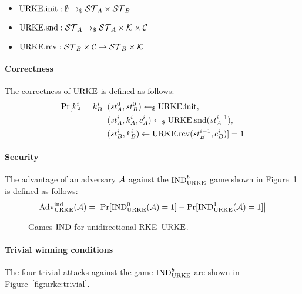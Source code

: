 \begin{itemize}
    \item $\mathrm{URKE}.\mathrm{init}: \emptyset\to_\$\mathcal{ST}_A\times\mathcal{ST}_B$
    \item $\mathrm{URKE}.\mathrm{snd}: \mathcal{ST}_A\to_\$\mathcal{ST}_A\times\mathcal{K}\times\mathcal{C}$
    \item $\mathrm{URKE}.\mathrm{rcv}: \mathcal{ST}_B\times\mathcal{C}\to\mathcal{ST}_B\times\mathcal{K}$
\end{itemize}

\paragraph{Correctness} The correctness of $\mathrm{URKE}$ is defined as follows:
\begin{align*} %
    \Pr[k_A^i=k_B^i\mid &(\st_A^0, \st_B^0)\getsr\URKEinit, \\
                        &(\st_A^i, k_A^i, c_A^i)\getsr\URKEsnd(\st_A^{i-1}), \\
                        &(\st_B^i, k_B^i)\gets\URKErcv(\st_B^{i-1}, c_B^i)] = 1
\end{align*}

\paragraph{Security} The advantage of an adversary $\mathcal{A}$ against the ${\mathrm{IND}}_{\mathrm{URKE}}^b$ game shown in Figure~\ref{fig:urke:ind} is defined as follows:
\[\mathrm{Adv}_{\mathrm{URKE}}^{\mathrm{ind}}(\mathcal{A}) = \left|\Pr[{\mathrm{IND}}_{\mathrm{URKE}}^0(\mathcal{A})=1] - \Pr[{\mathrm{IND}}_{\mathrm{URKE}}^1(\mathcal{A})=1]\right|\]

\begin{figure}[!ht]
    \centering
    \nicoresetlinenr%
    \fbox{%
        \scalebox{\codescalefactor}{%
        }%
    }
    \caption{%
        Games ${\mathrm{IND}}$ for unidirectional RKE~$\mathrm{URKE}$.
    }
    \label{fig:urke:ind}
\end{figure}

\paragraph{Trivial winning conditions} The four trivial attacks against the game ${\mathrm{IND}}_{\mathrm{URKE}}^b$ are shown in Figure~\ref{fig:urke:trivial}.

